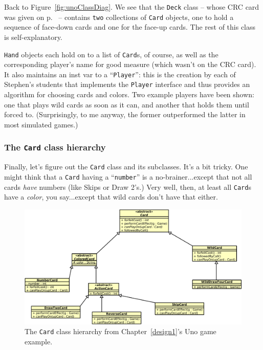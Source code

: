 Back to Figure~\ref{fig:unoClassDiag}. We see that the \texttt{Deck} class --
whose CRC card was given on p.~\pageref{unoCRC2} -- contains \texttt{two}
collections of \texttt{Card} objects, one to hold a sequence of face-down cards
and one for the face-up cards. The rest of this class is self-explanatory.

\texttt{Hand} objects each hold on to a list of \texttt{Card}s, of course, as
well as the corresponding player's name for good measure (which wasn't on the
CRC card). It also maintains an inst var to a ``\texttt{Player}'': this is the
creation by each of Stephen's students that implements the \texttt{Player}
interface and thus provides an algorithm for choosing cards and colors. Two
example players have been shown: one that plays wild cards as soon as it can,
and another that holds them until forced to. (Surprisingly, to me anyway, the
former outperformed the latter in most simulated games.)

\subsubsection{The \texttt{Card} class hierarchy}

Finally, let's figure out the \texttt{Card} class and its subclasses. It's a
bit tricky. One might think that a \texttt{Card} having a ``\texttt{number}''
is a no-brainer...except that not all cards \textit{have} numbers (like Skips
or Draw 2's.) Very well, then, at least all \texttt{Card}s have a
\textit{color}, you say...except that wild cards don't have that either.

\begin{figure}[ht]
\centering
\includegraphics[width=1\textwidth]{UnoClassHierarchy.png}
\medskip
\caption{The \texttt{Card} class hierarchy from Chapter~\ref{design1}'s
Uno game example.}
\label{fig:unoCardHier}
\end{figure}

